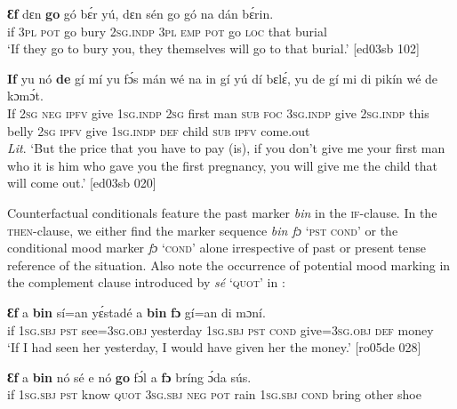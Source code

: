\ea%
    \label{ex:key:1527}
    \gll \textbf{Ɛf}  dɛn  \textbf{go}  gó  bɛ́r    yú,    dɛn  sén\textbf{  }go  gó  na  dán  bɛ́rin.\\
if  \textsc{3pl}  \textsc{pot}  go  bury  \textsc{2sg.indp}  \textsc{3pl}  \textsc{emp}  \textsc{pot}  go  \textsc{loc}  that  burial\\

\glt ‘If they go to bury you, they themselves will go to that burial.’ [ed03sb 102]
\z


\ea%
    \label{ex:key:1528}
    \gll \textbf{If}  yu  nó  \textbf{de}    gí  mí    yu  fɔ́s  mán
wé  na  in    gí  yú    dí  bɛlɛ́,    yu  de  gí
mi    di  pikín  wé  de  kɔmɔ́t.\\
If  \textsc{2sg}  \textsc{neg}  \textsc{ipfv}    give  \textsc{1sg.indp}  \textsc{2sg}  first  man
\textsc{sub}  \textsc{foc}  \textsc{3sg.indp}  give  \textsc{2sg.indp}  this  belly  \textsc{2sg}  \textsc{ipfv}  give
\textsc{1sg.indp}  \textsc{def}  child  \textsc{sub}  \textsc{ipfv}  come.out\\

\glt 
\textit{Lit}. ‘But the price that you have to pay (is), if you don’t give me your first man
who it is him who gave you the first pregnancy, you will give me the child that
will come out.’ [ed03sb 020]
\z

Counterfactual conditionals feature the past marker \textit{bin} in the \textsc{if-}clause. In the \textsc{then-}clause, we either find the marker sequence \textit{bin fɔ} ‘\textsc{pst} \textsc{cond’}\textit{}  or the conditional mood marker \textit{fɔ} ‘\textsc{cond’} alone  irrespective of past or present tense reference of the situation. Also note the occurrence of potential mood marking in the complement clause introduced by \textit{sé} ‘\textsc{quot}’ in :


\ea%
    \label{ex:key:1529}
    \gll \textbf{Ɛf}  a    \textbf{bin}  sí=an    yɛ́stadé    a    \textbf{bin}
\textbf{fɔ} gí=an    di  mɔní.\\
if  \textsc{1sg.sbj}  \textsc{pst}  see=\textsc{3sg.obj}  yesterday  \textsc{1sg.sbj}  \textsc{pst}
\textsc{cond}    give=\textsc{3sg.obj}  \textsc{def}  money\\

\glt ‘If I had seen her yesterday, I would have given her the money.’ [ro05de 028]
\z


\ea%
    \label{ex:key:1530}
    \gll \textbf{Ɛf}  a    \textbf{bin}  nó    sé    e    nó  \textbf{go} fɔ́l 
a    \textbf{fɔ} bríng  ɔ́da    sús.\\
if  \textsc{1sg.sbj}  \textsc{pst}  know  \textsc{quot}    \textsc{3sg.sbj}  \textsc{neg}  \textsc{pot}  rain  
\textsc{1sg.sbj}  \textsc{cond}    bring  other  shoe\\

